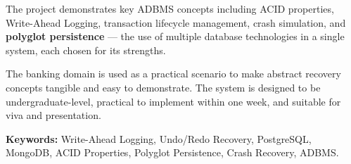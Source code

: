 \documentclass[12pt, a4paper]{report}
\begin{document}
The project demonstrates key ADBMS concepts including ACID properties,
Write-Ahead Logging, transaction lifecycle management, crash simulation,
and \textbf{polyglot persistence} --- the use of multiple database technologies
in a single system, each chosen for its strengths.

The banking domain is used as a practical scenario to make abstract recovery
concepts tangible and easy to demonstrate. The system is designed to be
undergraduate-level, practical to implement within one week, and suitable for
viva and presentation.

\vspace{0.5cm}
\noindent\textbf{Keywords:} Write-Ahead Logging, Undo/Redo Recovery, PostgreSQL,
MongoDB, ACID Properties, Polyglot Persistence, Crash Recovery, ADBMS.

\tableofcontents
\listoffigures
\listoftables







\end{document}
